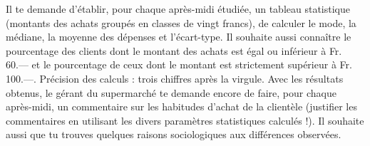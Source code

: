 \begin{exercice}
Il te demande d'établir, pour chaque après-midi étudiée, un tableau statistique (montants des achats groupés en classes de vingt francs), de calculer le mode, la médiane, la moyenne des dépenses et l'écart-type. Il souhaite aussi connaître le pourcentage des clients dont le montant des achats est égal ou inférieur à Fr. 60.–– et le pourcentage de ceux dont le montant est strictement supérieur à Fr. 100.—. Précision des calculs : trois chiffres après la virgule.
Avec les résultats obtenus, le gérant du supermarché te demande encore de faire, pour chaque après-midi, un commentaire sur les habitudes d'achat de la clientèle (justifier les commentaires en utilisant les divers paramètres statistiques calculés !). Il souhaite aussi que tu trouves quelques raisons sociologiques aux différences observées.
\end{exercice}

